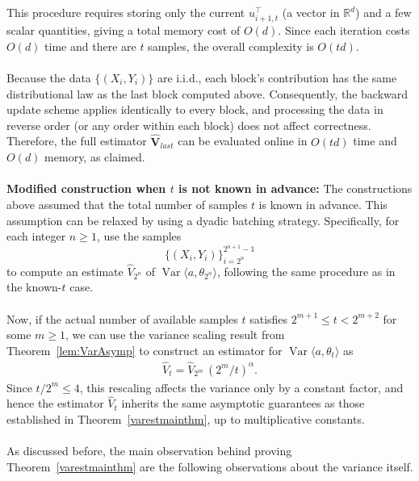 \documentclass[11pt, reqno,english]{amsart}
\DeclareMathOperator{\Var}{Var} \DeclareMathOperator{\N}{N}
\begin{document}
This procedure requires storing only the current $u^\top_{i+1,t}$ (a vector in $\mathbb{R}^d$) and a few scalar quantities, giving a total memory cost of $O(d)$. 
Since each iteration costs $O(d)$ time and there are $t$ samples, the overall complexity is $O(td)$.
\\\\
Because the data $\{(X_i, Y_i)\}$ are i.i.d., each block’s contribution has the same distributional law as the last block computed above. 
Consequently, the backward update scheme applies identically to every block, and processing the data in reverse order (or any order within each block) does not affect correctness. 
Therefore, the full estimator $\hat{\mathbf{V}}_{last}$ can be evaluated online in $O(td)$ time and $O(d)$ memory, as claimed.
\\\\
\textbf{Modified construction when $t$ is not known in advance:} The constructions above assumed that the total number of samples $t$ is known in advance. 
This assumption can be relaxed by using a dyadic batching strategy. 
Specifically, for each integer $n \ge 1$, use the samples 
\[
\{(X_i, Y_i)\}_{i = 2^n}^{2^{n+1}-1}
\]
to compute an estimate $\hat{V}_{2^n}$ of $\Var \langle a, \theta_{2^n} \rangle$, 
following the same procedure as in the known-$t$ case. 
\\\\
Now, if the actual number of available samples $t$ satisfies 
$2^{m+1} \le t < 2^{m+2}$ for some $m \ge 1$, 
we can use the variance scaling result from Theorem~\ref{lem:VarAsymp} 
to construct an estimator for $\Var \langle a, \theta_t \rangle$ as
\begin{align*}
    \hat{V}_t = \hat{V}_{2^m}\,(2^m / t)^{\alpha}.
\end{align*}
Since $t / 2^m \le 4$, this rescaling affects the variance only by a constant factor, 
and hence the estimator $\hat{V}_t$ inherits the same asymptotic guarantees 
as those established in Theorem~\ref{varestmainthm}, up to multiplicative constants.
\\\\
As discussed before, the main observation behind proving Theorem~\ref{varestmainthm} are the following observations about the variance itself.  
\end{document}
